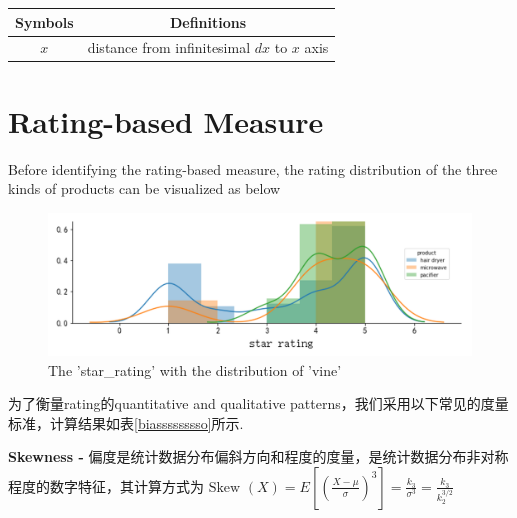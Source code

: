 \documentclass[12pt]{article}%
\begin{document}
	\begin{table}[H]
	\label{biao} \centering
	\begin{tabular}{cc}
		\toprule[1.5pt]
		\multicolumn{1}{m{3cm}}{\centering Symbols} & \multicolumn{1}{m{10cm}}{\centering Definitions} \\
		\midrule[1pt]
		$x$	 &  distance from infinitesimal $dx$ to $x$ axis\\
		\bottomrule[1.5pt]
	\end{tabular}
\end{table}



\section{Rating-based Measure}
Before identifying the rating-based measure, the rating distribution of the three kinds of products can be visualized as below 


\begin{figure}[H]
	\centering
	\includegraphics[width=1\textwidth]{score.png}%
	\caption{The 'star\_rating' with the distribution of 'vine'	}\label{scosssre}%
\end{figure}

为了衡量rating的quantitative and qualitative patterns，我们采用以下常见的度量标准，计算结果如表\ref{biasssssssso}所示.

\textbf{Skewness -} 偏度是统计数据分布偏斜方向和程度的度量，是统计数据分布非对称程度的数字特征，其计算方式为$\text { Skew }(X)=E\left[\left(\frac{X-\mu}{\sigma}\right)^{3}\right]=\frac{k_{3}}{\sigma^{3}}=\frac{k_{3}}{k_{2}^{3 / 2}}
$
\end{document}
